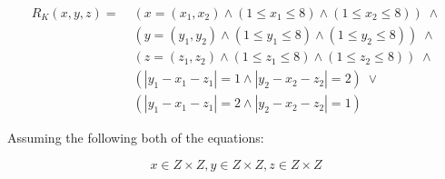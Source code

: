 \documentclass[a4paper]{article}
\begin{document}
\begin{equation}
\begin{split}
R_K(x, y, z) = \; &(x = (x_1, x_2) \wedge (1 \leq x_1 \leq 8) 
                                   \wedge (1 \leq x_2 \leq 8)) \;\wedge \\
                  &(y = (y_1, y_2) \wedge (1 \leq y_1 \leq 8) 
                                   \wedge (1 \leq y_2 \leq 8)) \;\wedge \\
                  &(z = (z_1, z_2) \wedge (1 \leq z_1 \leq 8) 
                                   \wedge (1 \leq z_2 \leq 8)) \;\wedge \\
               &(|y_1 - x_1 - z_1| = 1 \wedge |y_2 - x_2 - z_2| = 2)\;\vee \\
               &(|y_1 - x_1 - z_1| = 2 \wedge |y_2 - x_2 - z_2| = 1)
\end{split}
\end{equation}

Assuming the following both of the equations:

\begin{equation}
x \in Z \times Z, y \in Z \times Z, z \in Z \times Z
\end{equation}
\end{document}
